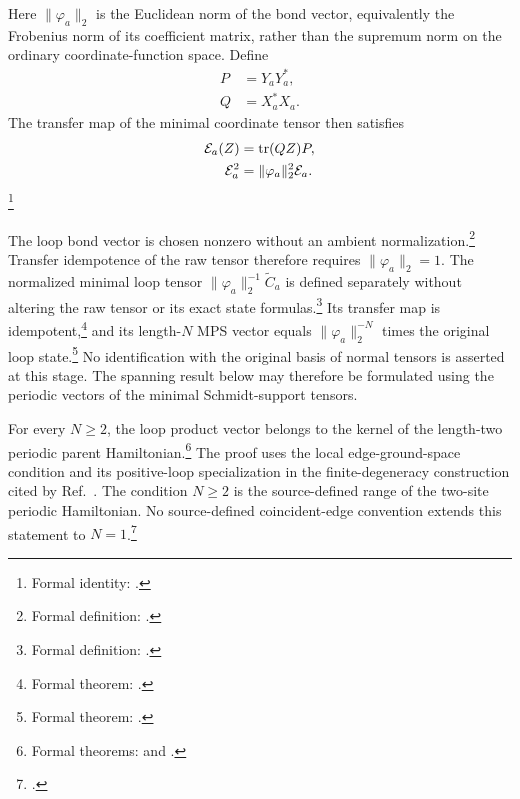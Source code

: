\documentclass{article}
\begin{document}
Here $\lVert\varphi_a\rVert_2$ is the Euclidean norm of the bond vector,
equivalently the Frobenius norm of its coefficient matrix, rather than the
supremum norm on the ordinary coordinate-function space. Define
\begin{align}
    P
        &=Y_aY_a^*,
    \label{eq:cpsv16_nncph_ground_state_scope_transfer_rank_one_P}\\
    Q
        &=X_a^*X_a.
    \label{eq:cpsv16_nncph_ground_state_scope_transfer_rank_one_Q}
\end{align}
The transfer map of the minimal coordinate tensor then satisfies
\begin{align}
    \mathcal E_a(Z)
        &=\operatorname{tr}(QZ)P,
    \label{eq:cpsv16_nncph_ground_state_scope_transfer_rank_one}\\
    \mathcal E_a^2
        &=\lVert\varphi_a\rVert_2^2\mathcal E_a.
    \label{eq:cpsv16_nncph_ground_state_scope_transfer_quasi_idempotence}
\end{align}
\footnote{Formal identity:
.}

The loop bond vector is chosen nonzero without an ambient
normalization.\footnote{Formal definition:
.} Transfer idempotence of
the raw tensor therefore requires $\lVert\varphi_a\rVert_2=1$. The normalized
minimal loop tensor $\lVert\varphi_a\rVert_2^{-1}\widetilde C_a$ is defined
separately without altering the raw tensor or its exact state
formulas.\footnote{Formal definition:
.} Its
transfer map is idempotent,\footnote{Formal theorem:
.}
and its length-$N$ MPS vector equals $\lVert\varphi_a\rVert_2^{-N}$ times the
original loop state.\footnote{Formal theorem:
.} No
identification with the original basis of normal tensors is asserted at this
stage. The spanning result below may therefore be formulated using the periodic
vectors of the minimal Schmidt-support tensors.

For every $N\geq2$, the loop product vector belongs to the kernel of the
length-two periodic parent Hamiltonian.\footnote{Formal theorems:
and
.}
The proof uses the local edge-ground-space condition and its positive-loop
specialization in the finite-degeneracy construction cited by
Ref.~\cite{Cirac2016MPDO_arXiv}. The condition $N\geq2$ is the source-defined
range of the two-site periodic Hamiltonian. No source-defined coincident-edge
convention extends this statement to $N=1$.\footnote{.}
\end{document}
